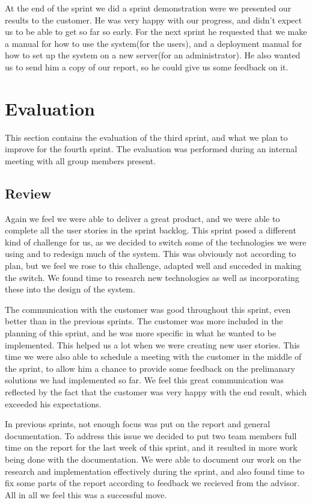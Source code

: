 At the end of the sprint we did a sprint demonstration were we presented our results to the customer. He was very happy with our progress, and didn't expect us to be able to get so far so early. For the next sprint he requested that we make a manual for how to use the system(for the users), and a deployment manual for how to set up the system on a new server(for an administrator). He also wanted us to send him a copy of our report, so he could give us some feedback on it.

\section{Evaluation}
This section contains the evaluation of the third sprint, and what we plan to improve for the fourth sprint. The evaluation was performed during an internal meeting with all group members present.

\subsection{Review}
Again we feel we were able to deliver a great product, and we were able to complete all the user stories in the sprint backlog. This sprint posed a different kind of challenge for us, as we decided to switch some of the technologies we were using and to redesign much of the system. This was obviously not according to plan, but we feel we rose to this challenge, adapted well and succeded in making the switch. We found time to research new technologies as well as incorporating these into the design of the system.


The communication with the customer was good throughout this sprint, even better than in the previous sprints. The customer was more included in the planning of this sprint, and he was more specific in what he wanted to be implemented. This helped us a lot when we were creating new user stories. This time we were also able to schedule a meeting with the customer in the middle of the sprint, to allow him a chance to provide some feedback on the prelimanary solutions we had implemented so far. We feel this great communication was reflected by the fact that the customer was very happy with the end result, which exceeded his expectations.


In previous sprints, not enough focus was put on the report and general documentation. To address this issue we decided to put two team members full time on the report for the last week of this sprint, and it resulted in more work being done with the documentation. We were able to document our work on the research and implementation effectively during the sprint, and also found time to fix some parts of the report according to feedback we recieved from the advisor. All in all we feel this was a successful move.


